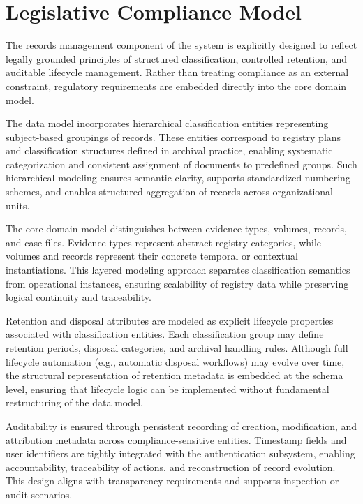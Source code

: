 ﻿%
\section{Legislative Compliance Model}

The records management component of the system is explicitly designed to reflect legally grounded principles of structured classification, controlled retention, and auditable lifecycle management. 
Rather than treating compliance as an external constraint, regulatory requirements are embedded directly into the core domain model.

The data model incorporates hierarchical classification entities representing subject-based groupings of records. 
These entities correspond to registry plans and classification structures defined in archival practice, enabling systematic categorization and consistent assignment of documents to predefined groups. 
Such hierarchical modeling ensures semantic clarity, supports standardized numbering schemes, and enables structured aggregation of records across organizational units.

The core domain model distinguishes between evidence types, volumes, records, and case files. 
Evidence types represent abstract registry categories, while volumes and records represent their concrete temporal or contextual instantiations. 
This layered modeling approach separates classification semantics from operational instances, ensuring scalability of registry data while preserving logical continuity and traceability.

Retention and disposal attributes are modeled as explicit lifecycle properties associated with classification entities. 
Each classification group may define retention periods, disposal categories, and archival handling rules. 
Although full lifecycle automation (e.g., automatic disposal workflows) may evolve over time, the structural representation of retention metadata is embedded at the schema level, ensuring that lifecycle logic can be implemented without fundamental restructuring of the data model.

Auditability is ensured through persistent recording of creation, modification, and attribution metadata across compliance-sensitive entities. 
Timestamp fields and user identifiers are tightly integrated with the authentication subsystem, enabling accountability, traceability of actions, and reconstruction of record evolution. 
This design aligns with transparency requirements and supports inspection or audit scenarios.


